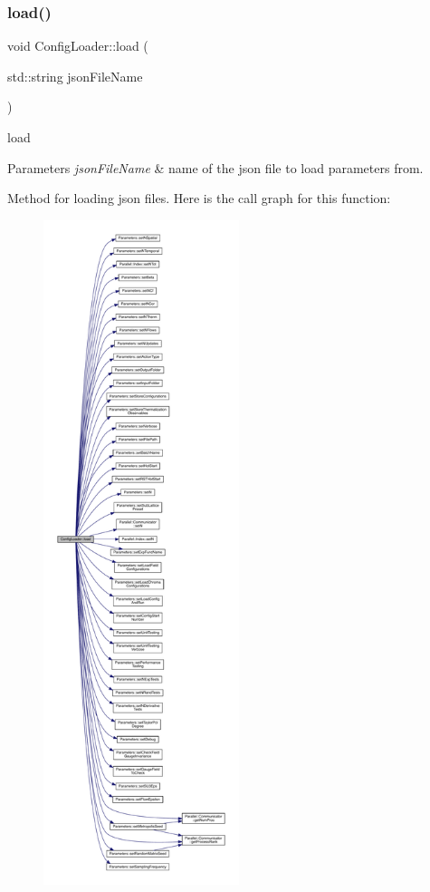 \subsubsection{\texorpdfstring{load()}{load()}}
{\footnotesize\ttfamily void Config\+Loader\+::load (\begin{DoxyParamCaption}\item[{std\+::string}]{json\+File\+Name }\end{DoxyParamCaption})}



load 


\begin{DoxyParams}{Parameters}
{\em json\+File\+Name} & name of the json file to load parameters from.\\
\hline
\end{DoxyParams}
Method for loading json files. Here is the call graph for this function\+:\nopagebreak
\begin{figure}[H]
\begin{center}
\leavevmode
\includegraphics[height=550pt]{namespace_config_loader_a26cf01adba9411ef1fa006d5068d7cc4_cgraph}
\end{center}
\end{figure}
